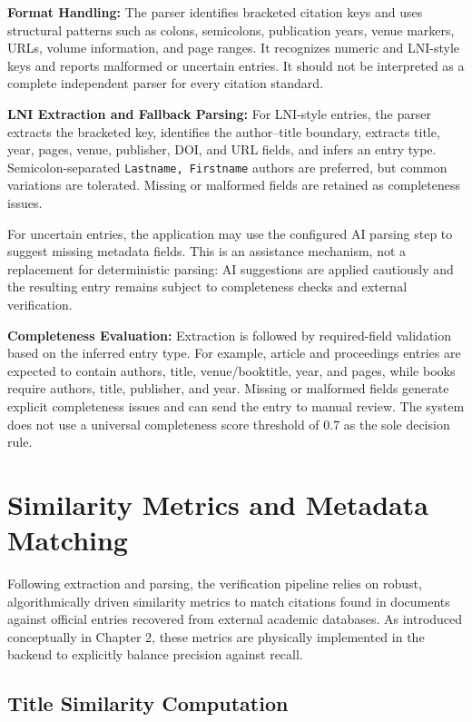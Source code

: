 \documentclass[12pt,a4paper,oneside]{report}
\begin{document}
\textbf{Format Handling:} The parser identifies bracketed citation keys and uses structural patterns such as colons, semicolons, publication years, venue markers, URLs, volume information, and page ranges. It recognizes numeric and LNI-style keys and reports malformed or uncertain entries. It should not be interpreted as a complete independent parser for every citation standard.

\textbf{LNI Extraction and Fallback Parsing:} For LNI-style entries, the parser extracts the bracketed key, identifies the author--title boundary, extracts title, year, pages, venue, publisher, DOI, and URL fields, and infers an entry type. Semicolon-separated \texttt{Lastname, Firstname} authors are preferred, but common variations are tolerated. Missing or malformed fields are retained as completeness issues.

For uncertain entries, the application may use the configured AI parsing step to suggest missing metadata fields. This is an assistance mechanism, not a replacement for deterministic parsing: AI suggestions are applied cautiously and the resulting entry remains subject to completeness checks and external verification.

\textbf{Completeness Evaluation:} Extraction is followed by required-field validation based on the inferred entry type. For example, article and proceedings entries are expected to contain authors, title, venue/booktitle, year, and pages, while books require authors, title, publisher, and year. Missing or malformed fields generate explicit completeness issues and can send the entry to manual review. The system does not use a universal completeness score threshold of 0.7 as the sole decision rule.

\section{Similarity Metrics and Metadata Matching}

Following extraction and parsing, the verification pipeline relies on robust, algorithmically driven similarity metrics to match citations found in documents against official entries recovered from external academic databases. As introduced conceptually in Chapter 2, these metrics are physically implemented in the backend to explicitly balance precision against recall.

\subsection{Title Similarity Computation}
\end{document}
